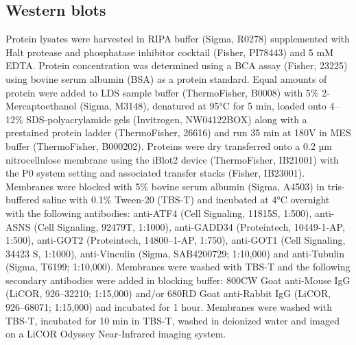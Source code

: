 \subsection{Western blots}
Protein lysates were harvested in RIPA buffer (Sigma, R0278) supplemented with Halt protease and phosphatase inhibitor cocktail (Fisher, PI78443) and 5 mM EDTA.
Protein concentration was determined using a BCA assay (Fisher, 23225) using bovine serum albumin (BSA) as a protein standard.
Equal amounts of protein were added to LDS sample buffer (ThermoFisher, B0008) with 5\% 2-Mercaptoethanol (Sigma, M3148), denatured at 95°C for 5 min, loaded onto 4–12\% SDS-polyacrylamide gels (Invitrogen, NW04122BOX) along with a prestained protein ladder (ThermoFisher, 26616) and run 35 min at 180V in MES buffer (ThermoFisher, B000202).
Proteins were dry transferred onto a 0.2 µm nitrocellulose membrane using the iBlot2 device (ThermoFisher, IB21001) with the P0 system setting and associated transfer stacks (Fisher, IB23001).
Membranes were blocked with 5\% bovine serum albumin (Sigma, A4503) in tris-buffered saline with 0.1\% Tween-20 (TBS-T) and incubated at 4°C overnight with the following antibodies:
anti-ATF4 (Cell Signaling, 11815S, 1:500),
anti-ASNS (Cell Signaling, 92479T, 1:1000),
anti-GADD34 (Proteintech, 10449-1-AP, 1:500),
anti-GOT2 (Proteintech, 14800–1-AP, 1:750),
anti-GOT1 (Cell Signaling, 34423 S, 1:1000),
anti-Vinculin (Sigma, SAB4200729; 1:10,000) and anti-Tubulin (Sigma, T6199; 1:10,000).
Membranes were washed with TBS-T and the following secondary antibodies were added in blocking buffer: 800CW Goat anti-Mouse IgG (LiCOR, 926–32210; 1:15,000) and/or 680RD Goat anti-Rabbit IgG (LiCOR, 926–68071; 1:15,000) and incubated for 1 hour.
Membranes were washed with TBS-T, incubated for 10 min in TBS-T, washed in deionized water and imaged on a LiCOR Odyssey Near-Infrared imaging system.


